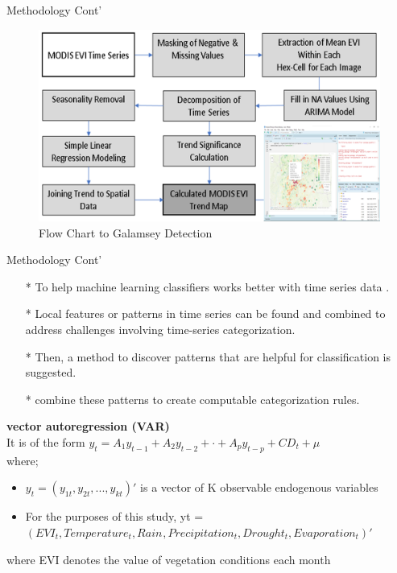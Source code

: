 \documentclass[11pt]{beamer}
\begin{document}
\begin{frame}
	\begin{block}{Methodology Cont'}
		\begin{figure}
			\centering
			\includegraphics[width=0.7\linewidth]{images/Methodology}
			\caption{Flow Chart to Galamsey Detection}
			\label{fig:methodology}
		\end{figure}
		
	\end{block}
\end{frame}
\begin{frame}
	\begin{block}{Methodology Cont'}
		\begin{itemize}
		\item[*] To help machine learning classifiers works better with time series data .
		\item[*] Local features or patterns in time series can be found and combined to address challenges involving time-series categorization.
		\item[*] Then, a method to discover patterns that are helpful for classification is suggested.
		\item[*] combine these patterns to create computable categorization rules. 
	\end{itemize}
\textbf{vector autoregression (VAR) }\\

It is of the form 
$y_{t} = A_{1}y_{t-1} + A_{2}y_{t-2} +\cdot+A_{p}y_{t-p}+ CD_{t} + \mu $\\
where;\\
\begin{itemize}
	\item  $ y_{t} = \left( y_{1t},y_{2t},...,y_{kt}\right)'$ is a vector of K observable endogenous variables \\
\item    For the purposes of this study, yt = $(EVI_{t}, Temperature_{t}, Rain_{}, Precipitation_{t},Drought_{t},Evaporation_{t})'$
\end{itemize}
 where EVI denotes the value of vegetation conditions  each month
	\end{block}
\end{frame}
\end{document}
